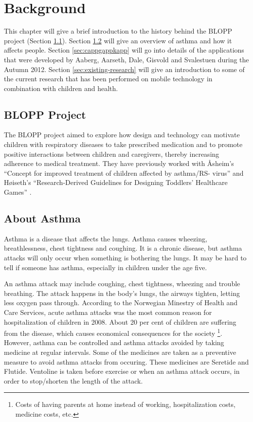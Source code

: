 \chapter{Background}
\label{chp:background}

This chapter will give a brief introduction to the history behind the BLOPP project (Section \ref{sec:bloppproject}). Section \ref{sec:about-asthma} will give an overview of asthma and how it affects people. Section \ref{sec:cappgappkapp} will go into details of the applications that were developed by Aaberg, Aarseth, Dale, Gisvold and Svalestuen during the Autumn 2012.     
Section \ref{sec:existing-research} will give an introduction to some of the current research that has been performed on mobile technology in combination with children and health.   


\section{BLOPP Project}
\label{sec:bloppproject}
The BLOPP project aimed to explore how design and technology can motivate children with respiratory diseases to take prescribed medication and to promote positive interactions between children and caregivers, thereby increasing adherence to medical treatment. They have previously worked with \r{A}sheim's ``Concept for improved treatment of children affected by asthma/RS- virus''\cite{asheim2012konsept} and H\o iseth's ``Research-Derived Guidelines for Designing Toddlers' Healthcare Games'' \cite{hoiseth2013research}.


\section{About Asthma}
\label{sec:about-asthma}
Asthma is a disease that affects the lungs. Asthma causes wheezing, breathlessness, chest tightness and coughing. It is a chronic disease, but asthma attacks will only occur when something is bothering the lungs. It may be hard to tell if someone has asthma, especially in children under the age five. 


An asthma attack may include coughing, chest tightness, wheezing and trouble breathing. The attack happens in the body's lungs, the airways tighten, letting less oxygen pass through.
According to the Norwegian Minestry of Health and Care Services, acute asthma attacks was the most common reason for hospitalization of children in 2008\cite{NationalStrategy}. About 20 per cent of children are suffering from the disease, which causes economical consequences for the society \footnote{Costs of having parents at home instead of working, hospitalization costs, medicine costs, etc.}. However, asthma can be controlled and asthma attacks avoided by taking medicine at regular intervals. Some of the medicines are taken as a preventive measure to avoid asthma attacks from occuring. These medicines are Seretide and Flutide. Ventoline is taken before exercise or when an asthma attack occurs, in order to stop/shorten the length of the attack. 


